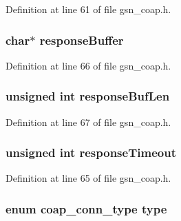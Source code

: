 Definition at line 61 of file gsn\_\-coap.h.

\hypertarget{a00040_aeb021c3121e95e8f02b5b3e2c856636a}{
\subsubsection[{responseBuffer}]{\setlength{\rightskip}{0pt plus 5cm}char$\ast$ {\bf responseBuffer}}}
\label{a00040_aeb021c3121e95e8f02b5b3e2c856636a}


Definition at line 66 of file gsn\_\-coap.h.

\hypertarget{a00040_afd3ab8c211af1d9d40ede0157631dbb2}{
\subsubsection[{responseBufLen}]{\setlength{\rightskip}{0pt plus 5cm}unsigned int {\bf responseBufLen}}}
\label{a00040_afd3ab8c211af1d9d40ede0157631dbb2}


Definition at line 67 of file gsn\_\-coap.h.

\hypertarget{a00040_ac927f3777727f3e6531ce7ddbd12c405}{
\subsubsection[{responseTimeout}]{\setlength{\rightskip}{0pt plus 5cm}unsigned int {\bf responseTimeout}}}
\label{a00040_ac927f3777727f3e6531ce7ddbd12c405}


Definition at line 65 of file gsn\_\-coap.h.

\hypertarget{a00040_a0732b6df1426f35ef3677a29fbdb5786}{
\subsubsection[{type}]{\setlength{\rightskip}{0pt plus 5cm}enum {\bf coap\_\-conn\_\-type} {\bf type}}}
\label{a00040_a0732b6df1426f35ef3677a29fbdb5786}


